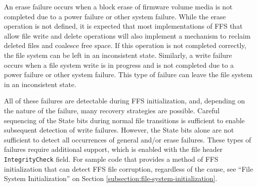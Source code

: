 An erase failure occurs when a block erase of firmware volume media is not completed due to a
power failure or other system failure. While the erase operation is not defined, it is expected that
most implementations of FFS that allow file write and delete operations will also implement a
mechanism to reclaim deleted files and coalesce free space. If this operation is not completed
correctly, the file system can be left in an inconsistent state.
Similarly, a write failure occurs when a file system write is in progress and is not completed due to a
power failure or other system failure. This type of failure can leave the file system in an inconsistent
state.

All of these failures are detectable during FFS initialization, and, depending on the nature of the
failure, many recovery strategies are possible. Careful sequencing of the State bits during normal
file transitions is sufficient to enable subsequent detection of write failures. However, the State
bits alone are not sufficient to detect all occurrences of general and/or erase failures. These types of
failures require additional support, which is enabled with the file header \verb|IntegrityCheck| field.
For sample code that provides a method of FFS initialization that can detect FFS file corruption,
regardless of the cause, see “File System Initialization” on Section \ref{subsection:file-system-initialization}.



